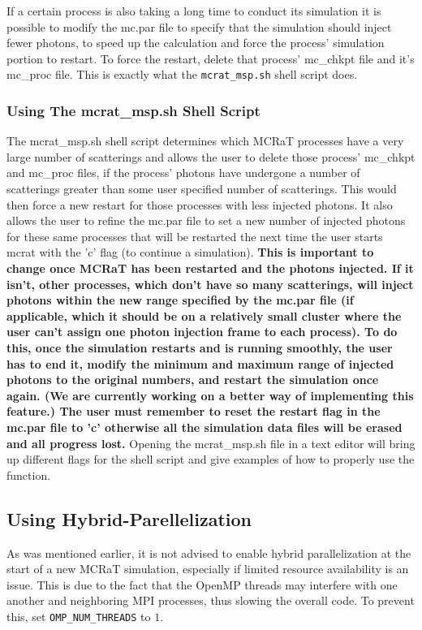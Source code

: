 \documentclass[12pt,a4paper]{article}
\begin{document}
 If a certain process is also taking a long time to conduct its simulation it is possible to modify the mc.par file to specify that the simulation should inject fewer photons, to speed up the calculation and force the process' simulation portion to restart. To force the restart, delete that process' mc\_chkpt file and it's  mc\_proc file. This is exactly what the \texttt{mcrat\_msp.sh} shell script does. 
 
 \subsubsection{Using The mcrat\_msp.sh Shell Script}
 The mcrat\_msp.sh shell script determines which MCRaT processes have a very large number of scatterings and allows the user to delete those process' mc\_chkpt and mc\_proc files, if the process' photons have undergone a number of scatterings greater than some user specified number of scatterings. This would then force a new restart for those processes with less injected photons. It also allows the user to refine the mc.par file to set a new number of injected photons for these same processes that will be restarted the next time the user starts mcrat with the 'c' flag (to continue a simulation). {\bf This is important to change once MCRaT has been restarted and the photons injected. If it isn't, other processes, which don't have so many scatterings, will inject photons within the new range specified by the mc.par file (if applicable, which it should be on a relatively small cluster where the user can't assign one photon injection frame to each process). To do this, once the simulation restarts and is running smoothly, the user has to end it, modify the minimum and maximum range of injected photons to the original numbers, and restart the simulation once again. (We are currently working on a better way of implementing this feature.) The user must remember to reset the restart flag in the mc.par file to 'c' otherwise all the simulation data files will be erased and all progress lost.} Opening the mcrat\_msp.sh file in a text editor will bring up different flags for the shell script and give examples of how to properly use the function.
 
 \subsection{Using Hybrid-Parellelization}
 As was mentioned earlier, it is not advised to enable hybrid parallelization at the start of a new MCRaT simulation, especially if limited resource availability is an issue. This is due to the fact that the OpenMP threads may interfere with one another and neighboring MPI processes, thus slowing the overall code. To prevent this, set \texttt{OMP\_NUM\_THREADS} to $1$.
 
\end{document}
